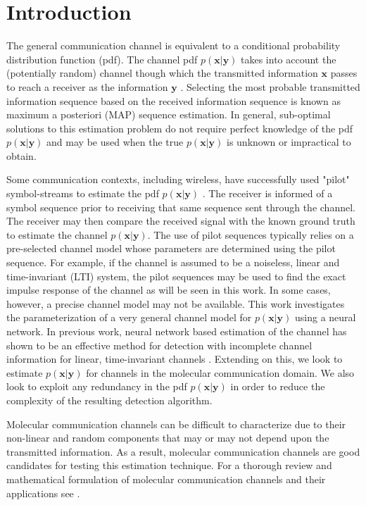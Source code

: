 \section{Introduction}

The general communication channel is equivalent to a conditional probability distribution function (pdf). The channel pdf $p(\mathbf{x}|\mathbf{y})$ takes into account the (potentially random) channel though which the transmitted information $\mathbf{x}$ passes to reach a receiver as the information $\mathbf{y}$ \cite[Ch.~7]{cover2012elements}. Selecting the most probable transmitted information sequence based on the received information sequence is known as maximum a posteriori (MAP) sequence estimation. In general, sub-optimal solutions to this estimation problem do not require perfect knowledge of the pdf $p(\mathbf{x}|\mathbf{y})$ and may be used when the true $p(\mathbf{x}|\mathbf{y})$ is unknown or impractical to obtain.

\par
Some communication contexts, including wireless, have successfully used "pilot" symbol-streams to estimate the pdf $p(\mathbf{x}|\mathbf{y})$ \cite{van1995channel}. The receiver is informed of a symbol sequence prior to receiving that same sequence sent through the channel. The receiver may then compare the received signal with the known ground truth to estimate the channel $p(\mathbf{x}|\mathbf{y})$.
The use of pilot sequences typically relies on a pre-selected channel model whose parameters are determined using the pilot sequence. For example, if the channel is assumed to be a noiseless, linear and time-invariant (LTI) system, the pilot sequences may be used to find the exact impulse response of the channel as will be seen in this work. In some cases, however, a precise channel model may not be available. This work investigates the parameterization of a very general channel model for $p(\mathbf{x}|\mathbf{y})$ using a neural network. In previous work, neural network based estimation of the channel has shown to be an effective method for detection with incomplete channel information for linear, time-invariant channels \cite{shlezinger2019viterbinet} \cite{shlezinger2020datadriven}.
 Extending on this, we look to estimate $p(\mathbf{x}|\mathbf{y})$ for channels in the molecular communication domain.
 We also look to exploit any redundancy in the pdf $p(\mathbf{x}|\mathbf{y})$ in order to reduce the complexity of the resulting detection algorithm.
\par
Molecular communication channels can be difficult to characterize due to their non-linear and random components that may or may not depend upon the transmitted information. As a result, molecular communication channels are good candidates for testing this estimation technique. For a thorough review and mathematical formulation of molecular communication channels and their applications see \cite{jamali2019channel}. 

